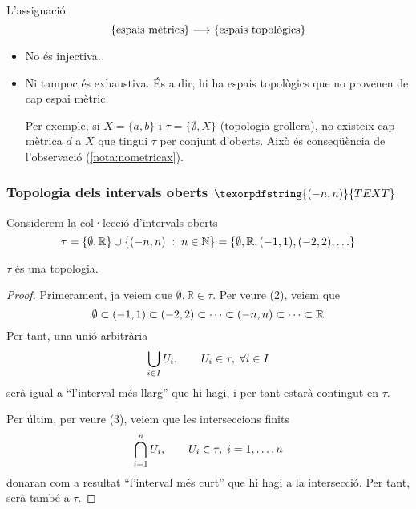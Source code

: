 \documentclass[../main.tex]{subfiles}
\begin{document}
\begin{nota}
\label{nota:noinjectivaniexhaustiva} L'assignació
\begin{equation}
    \notag
    \{\text{espais mètrics}\}\longrightarrow \{\text{espais topològics}\}
\end{equation}
\begin{itemize}
    \item No és injectiva.
    \item Ni tampoc és exhaustiva. És a dir, hi ha espais topològics que no provenen de cap espai mètric.
    
    Per exemple, si $X = \{a,b\}$ i $\tau = \{\emptyset,X\}$ (topologia grollera), no existeix cap mètrica $d$ a $X$ que tingui $\tau$ per conjunt d'oberts. Això és conseqüència de l'observació (\ref{nota:nometricax}).
\end{itemize}
\end{nota}

\subsubsection{Topologia dels intervals oberts $\texorpdfstring{(-n,n)}{TEXT}$}

\label{def:topologiadelsintervalsnn}
Considerem la col·lecció d'intervals oberts
\begin{equation}
    \notag 
    \tau = \{\emptyset,\mathbb{R}\}\cup\{(-n,n)\;:\;n\in\mathbb{N}\}= \{\emptyset,\mathbb{R},(-1,1),(-2,2),\ldots\}
\end{equation}

\begin{prop}
\label{prop:topologiadelsintervalsnn} $\tau$ és una topologia.
\end{prop}
\begin{proof}
Primerament, ja veiem que $\emptyset,\mathbb{R}\in\tau$. Per veure (2), veiem que 
\begin{equation}
    \notag
    \emptyset\subset (-1,1)\subset (-2,2)\subset\cdots\subset(-n,n)\subset\cdots\subset\mathbb{R}
\end{equation}
Per tant, una unió arbitrària
\begin{equation}
    \notag
    \bigcup_{i\in I}U_i,\qquad U_i\in\tau,\;\forall i\in I
\end{equation}
serà igual a ``l'interval més llarg'' que hi hagi, i per tant estarà contingut en $\tau$.

Per últim, per veure (3), veiem que les interseccions finits
\begin{equation}
    \notag
    \bigcap_{i=1}^n U_i,\qquad U_i\in\tau,\; i=1,\ldots,n
\end{equation}
donaran com a resultat ``l'interval més curt'' que hi hagi a la intersecció. Per tant, serà també a $\tau$.
\end{proof}
\end{document}
